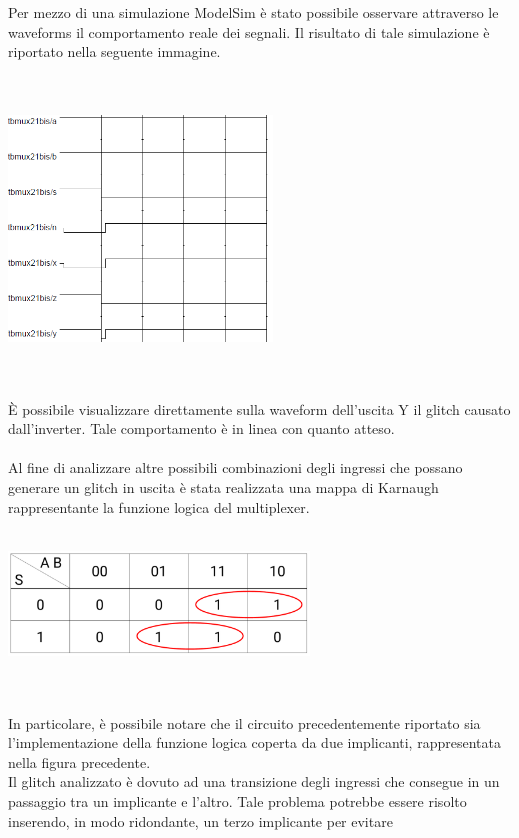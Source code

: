 \documentclass[11pt,  english, makeidx, a4paper, titlepage, oneside]{book}
\begin{document}
\\\\
Per mezzo di una simulazione ModelSim è stato possibile osservare
attraverso le waveforms il comportamento reale dei segnali. Il risultato
di tale simulazione è riportato nella seguente immagine.\\
\\\\
\centerline{\includegraphics[width=7cm]{./img/Lab_1/Es_4/Glitch.png}}
\\\\
È possibile visualizzare direttamente sulla waveform dell'uscita Y
il glitch causato dall'inverter. Tale comportamento è in linea con 
quanto atteso.
\\\\
Al fine di analizzare altre possibili combinazioni degli ingressi
che possano generare un glitch in uscita è stata realizzata una 
mappa di Karnaugh rappresentante la funzione logica del multiplexer.
\\\\
\centerline{\includegraphics[width=8cm]{./img/Lab_1/Es_4/Mappa_K_coperta.png}}
\\\\
In particolare, è possibile notare che il circuito precedentemente riportato sia l'implementazione della funzione logica coperta da due implicanti, rappresentata nella figura precedente.
\\
Il glitch analizzato è dovuto ad una transizione degli ingressi che consegue in un passaggio
tra un implicante e l'altro. Tale problema potrebbe essere risolto
inserendo, in modo ridondante, un terzo implicante per evitare
\end{document}
